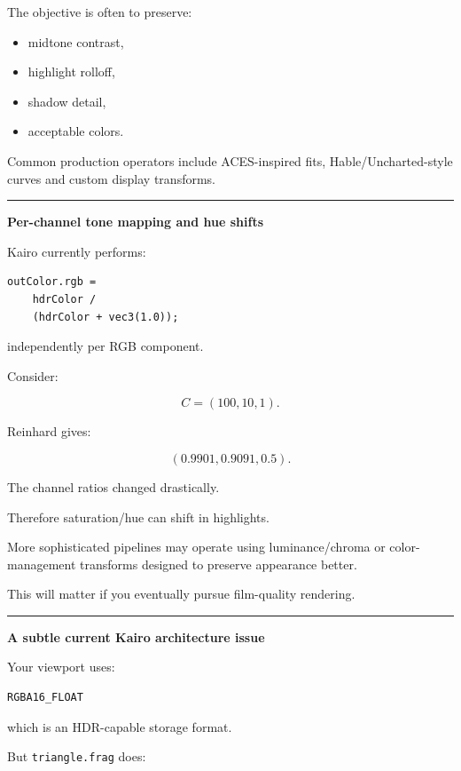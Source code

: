 The objective is often to preserve:

\begin{itemize}
\tightlist
\item
  midtone contrast,
\item
  highlight rolloff,
\item
  shadow detail,
\item
  acceptable colors.
\end{itemize}

Common production operators include ACES-inspired fits, Hable/Uncharted-style curves and custom display transforms.

\begin{center}\rule{0.5\linewidth}{0.5pt}\end{center}

\textbf{Per-channel tone mapping and hue shifts}

Kairo currently performs:

\begin{verbatim}
outColor.rgb =
    hdrColor /
    (hdrColor + vec3(1.0));
\end{verbatim}

independently per RGB component.

Consider:

\[
C=(100,10,1).
\]

Reinhard gives:

\[
(0.9901,0.9091,0.5).
\]

The channel ratios changed drastically.

Therefore saturation/hue can shift in highlights.

More sophisticated pipelines may operate using luminance/chroma or color-management transforms designed to preserve appearance better.

This will matter if you eventually pursue film-quality rendering.

\begin{center}\rule{0.5\linewidth}{0.5pt}\end{center}

\textbf{A subtle current Kairo architecture issue}

Your viewport uses:

\begin{verbatim}
RGBA16_FLOAT
\end{verbatim}

which is an HDR-capable storage format.

But \texttt{triangle.frag} does:


